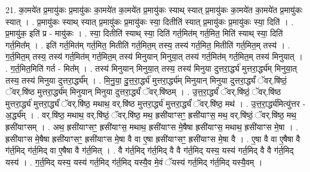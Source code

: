 \documentclass[17pt]{extarticle}
\begin{document}
21. का॒मये॑त प्र॒मायु॑कः प्र॒मायु॑कः का॒मये॑त का॒मये॑त प्र॒मायु॑कः स्याथ् स्यात् प्र॒मायु॑कः का॒मये॑त का॒मये॑त प्र॒मायु॑कः स्यात् । . प्र॒मायु॑कः स्याथ् स्यात् प्र॒मायु॑कः प्र॒मायु॑कः स्या॒ दितीति॑ स्यात् प्र॒मायु॑कः प्र॒मायु॑कः स्या॒ दिति॑ । . प्र॒मायु॑क॒ इति॑ प्र - मायु॑कः । . स्या॒ दितीति॑ स्याथ् स्या॒ दिति॑ गर्त॒मित॑म् गर्त॒मित॒ मिति॑ स्याथ् स्या॒ दिति॑ गर्त॒मित᳚म् । . इति॑ गर्त॒मित॑म् गर्त॒मित॒ मितीति॑ गर्त॒मित॒म् तस्य॒ तस्य॑ गर्त॒मित॒ मितीति॑ गर्त॒मित॒म् तस्य॑ । . ग॒र्त॒मित॒म् तस्य॒ तस्य॑ गर्त॒मित॑म् गर्त॒मित॒म् तस्य॑ मिनुयान् मिनुया॒त् तस्य॑ गर्त॒मित॑म् गर्त॒मित॒म् तस्य॑ मिनुयात् । . ग॒र्त॒मित॒मिति॑ गर्त - मित᳚म् । . तस्य॑ मिनुयान् मिनुया॒त् तस्य॒ तस्य॑ मिनुया दुत्तरा॒र्द्ध्य॑ मुत्तरा॒र्द्ध्य॑म् मिनुया॒त् तस्य॒ तस्य॑ मिनुया दुत्तरा॒र्द्ध्य᳚म् । . मि॒नु॒या॒ दु॒त्त॒रा॒र्द्ध्य॑ मुत्तरा॒र्द्ध्य॑म् मिनुयान् मिनुया दुत्तरा॒र्द्ध्यं॑ ॅवर्.षि॑ष्ठं॒ ॅवर्.षि॑ष्ठ मुत्तरा॒र्द्ध्य॑म् मिनुयान् मिनुया दुत्तरा॒र्द्ध्यं॑ ॅवर्.षि॑ष्ठम् । . उ॒त्त॒रा॒र्द्ध्यं॑ ॅवर्.षि॑ष्ठं॒ ॅवर्.षि॑ष्ठ मुत्तरा॒र्द्ध्य॑ मुत्तरा॒र्द्ध्यं॑ ॅवर्.षि॑ष्ठ॒ मथाथ॒ वर्.षि॑ष्ठ मुत्तरा॒र्द्ध्य॑ मुत्तरा॒र्द्ध्यं॑ ॅवर्.षि॑ष्ठ॒ मथ॑ । . उ॒त्त॒रा॒र्द्ध्य॑मित्यु॑त्तर - अ॒र्द्ध्य᳚म् । . वर्.षि॑ष्ठ॒ मथाथ॒ वर्.षि॑ष्ठं॒ ॅवर्.षि॑ष्ठ॒ मथ॒ ह्रसी॑याꣳसꣳ॒॒ ह्रसी॑याꣳस॒ मथ॒ वर्.षि॑ष्ठं॒ ॅवर्.षि॑ष्ठ॒ मथ॒ ह्रसी॑याꣳसम् । . अथ॒ ह्रसी॑याꣳसꣳ॒॒ ह्रसी॑याꣳस॒ मथाथ॒ ह्रसी॑याꣳस मे॒षैषा ह्रसी॑याꣳस॒ मथाथ॒ ह्रसी॑याꣳस मे॒षा । . ह्रसी॑याꣳस मे॒षैषा ह्रसी॑याꣳसꣳ॒॒ ह्रसी॑याꣳस मे॒षा वै वा ए॒षा ह्रसी॑याꣳसꣳ॒॒ ह्रसी॑याꣳस मे॒षा वै । . ए॒षा वै वा ए॒षैषा वै ग॑र्त॒मिद् ग॑र्त॒मिद् वा ए॒षैषा वै ग॑र्त॒मित् । . वै ग॑र्त॒मिद् ग॑र्त॒मिद् वै वै ग॑र्त॒मिद् यस्य॒ यस्य॑ गर्त॒मिद् वै वै ग॑र्त॒मिद् यस्य॑ । . ग॒र्त॒मिद् यस्य॒ यस्य॑ गर्त॒मिद् ग॑र्त॒मिद् यस्यै॒व मे॒वं ॅयस्य॑ गर्त॒मिद् ग॑र्त॒मिद् यस्यै॒वम् । \newline
\end{document}
